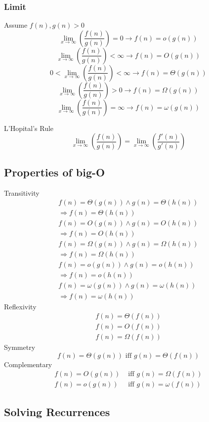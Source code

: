 \documentclass{article}
\begin{document}
\begin{multicols*}{4}
\newpage
\subsubsection{Limit}
Assume $f(n), g(n)>0$
$$\lim_{x\to\infty} \left(\frac{f(n)}{g(n)}\right) = 0 \rightarrow f(n)=o(g(n))$$
$$\lim_{x\to\infty} \left(\frac{f(n)}{g(n)}\right) < \infty \rightarrow f(n)=O(g(n))$$
$$0 < \lim_{x\to\infty} \left(\frac{f(n)}{g(n)}\right) < \infty \rightarrow f(n)=\Theta(g(n))$$
$$\lim_{x\to\infty} \left(\frac{f(n)}{g(n)}\right) > 0 \rightarrow f(n)=\Omega(g(n))$$
$$\lim_{x\to\infty} \left(\frac{f(n)}{g(n)}\right) = \infty \rightarrow f(n)=\omega(g(n))$$

\noindent L'Hopital's Rule
$$\lim_{x\to\infty} \left(\frac{f(n)}{g(n)}\right) = \lim_{x\to\infty} \left(\frac{f'(n)}{g'(n)}\right)$$

\subsection{Properties of big-O}
Transitivity
\begin{align*}
f(n)=\Theta(g(n))\land g(n)=\Theta(h(n)) \\ \Rightarrow f(n)=\Theta(h(n))\\
f(n)=O(g(n))\land g(n)=O(h(n)) \\ \Rightarrow f(n)=O(h(n))\\
f(n)=\Omega(g(n))\land g(n)=\Omega(h(n)) \\ \Rightarrow f(n)=\Omega(h(n))\\
f(n)=o(g(n))\land g(n)=o(h(n)) \\ \Rightarrow f(n)=o(h(n))\\
f(n)=\omega(g(n))\land g(n)=\omega(h(n)) \\ \Rightarrow f(n)=\omega(h(n))
\end{align*}
Reflexivity
\begin{align*}
f(n)=\Theta(f(n))\\
f(n)=O(f(n))\\
f(n)=\Omega(f(n))
\end{align*}
Symmetry
$$f(n)=\Theta(g(n))\text{ iff }g(n)=\Theta(f(n))$$
Complementary
\begin{align*}
f(n)=O(g(n))&\text{ iff } g(n)=\Omega(f(n))\\
f(n)=o(g(n))&\text{ iff }g(n)=\omega(f(n))
\end{align*}

\subsection{Solving Recurrences}

\end{multicols*}
\end{document}
